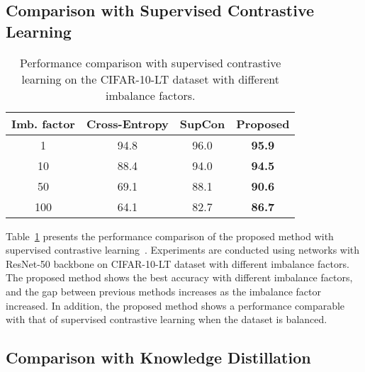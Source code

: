 \documentclass{article}
\theoremstyle{plain}
\theoremstyle{definition}
\theoremstyle{remark}
\begin{document}
\subsection{Comparison with Supervised Contrastive Learning} \label{sec:exp_supcon}

\begin{table}[t]
\centering
\caption{Performance comparison with supervised contrastive learning on the CIFAR-10-LT dataset with different imbalance factors.}
\begin{tabular}{c|c|c|c}
\hline
Imb. factor & Cross-Entropy & SupCon & \textbf{Proposed} \\ \hline
1                & 94.8          & 96.0   & \textbf{95.9}     \\
10               & 88.4          & 94.0   & \textbf{94.5}     \\
50               & 69.1          & 88.1   & \textbf{90.6}     \\
100              & 64.1          & 82.7   & \textbf{86.7}     \\ \hline
\end{tabular} \label{tab:comp_supcon}
\end{table}
Table~\ref{tab:comp_supcon} presents the performance comparison of the proposed method with supervised contrastive learning~\cite{khosla2020supervised}. Experiments are conducted using networks with ResNet-50 backbone on CIFAR-10-LT dataset with different imbalance factors. The proposed method shows the best accuracy with different imbalance factors, and the gap between previous methods increases as the imbalance factor increased. In addition, the proposed method shows a performance comparable with that of supervised contrastive learning when the dataset is balanced.


\subsection{Comparison with Knowledge Distillation} \label{sec:exp_kd}
\end{document}
